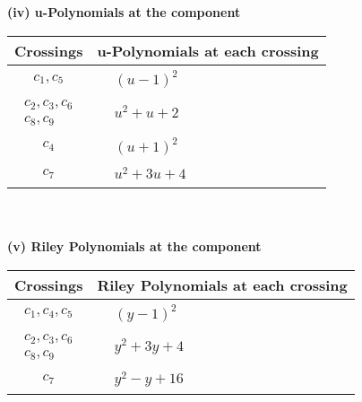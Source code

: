\documentclass[1p]{elsarticle_modified}
\theoremstyle{definition}
\begin{document}
\newpage\renewcommand{\arraystretch}{1}
\flushleft \textbf{(iv) u-Polynomials at the component}\newline \\
\begin{tabular}{m{50pt}|m{274pt}}
Crossings & \hspace{64pt}u-Polynomials at each crossing \\
\hline $$\begin{aligned}c_{1},c_{5}\end{aligned}$$&$\begin{aligned}
&(u-1)^2
\end{aligned}$\\
\hline $$\begin{aligned}c_{2},c_{3},c_{6}\\c_{8},c_{9}\end{aligned}$$&$\begin{aligned}
&u^2+u+2
\end{aligned}$\\
\hline $$\begin{aligned}c_{4}\end{aligned}$$&$\begin{aligned}
&(u+1)^2
\end{aligned}$\\
\hline $$\begin{aligned}c_{7}\end{aligned}$$&$\begin{aligned}
&u^2+3 u+4
\end{aligned}$\\
\hline
\end{tabular}\\~\\
\newpage\renewcommand{\arraystretch}{1}
\flushleft \textbf{(v) Riley Polynomials at the component}\newline \\
\begin{tabular}{m{50pt}|m{274pt}}
Crossings & \hspace{64pt}Riley Polynomials at each crossing \\
\hline $$\begin{aligned}c_{1},c_{4},c_{5}\end{aligned}$$&$\begin{aligned}
&(y-1)^2
\end{aligned}$\\
\hline $$\begin{aligned}c_{2},c_{3},c_{6}\\c_{8},c_{9}\end{aligned}$$&$\begin{aligned}
&y^2+3 y+4
\end{aligned}$\\
\hline $$\begin{aligned}c_{7}\end{aligned}$$&$\begin{aligned}
&y^2- y+16
\end{aligned}$\\
\hline
\end{tabular}\\~\\
\end{document}

